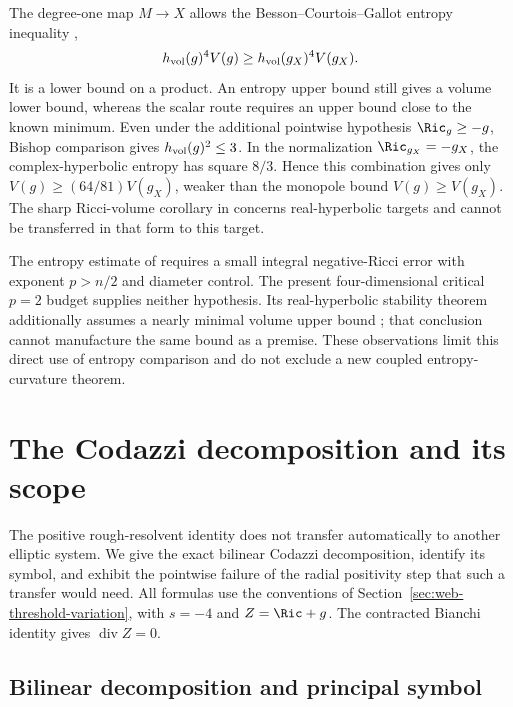 The degree-one map $M\to X$ allows the Besson--Courtois--Gallot
entropy inequality \cite{BessonCourtoisGallot1995},
\begin{equation}\label{webvar:entropy-volume}
 h_{\rm vol}(g)^4V(g)\ge h_{\rm vol}(g_X)^4V(g_X).
\end{equation}
It is a lower bound on a product.  An entropy upper bound still
gives a volume lower bound, whereas the scalar route requires an
upper bound close to the known minimum.  Even under the additional
pointwise hypothesis $\Ric_g\ge-g$, Bishop comparison gives
$h_{\rm vol}(g)^2\le3$.  In the normalization $\Ric_{g_X}=-g_X$,
the complex-hyperbolic entropy has square $8/3$.  Hence this
combination gives only $V(g)\ge(64/81)V(g_X)$, weaker than
the monopole bound $V(g)\ge V(g_X)$.  The sharp Ricci-volume
corollary in \cite{BessonCourtoisGallot1995} concerns real-hyperbolic
targets and cannot be transferred in that form to this target.

The entropy estimate of \cite[Theorem~1.4]{ChenWei} requires a
small integral negative-Ricci error with exponent $p>n/2$ and
diameter control.  The present four-dimensional critical $p=2$
budget supplies neither hypothesis.  Its real-hyperbolic stability
theorem additionally assumes a nearly minimal volume upper bound
\cite[Theorem~1.5]{ChenWei}; that conclusion cannot manufacture
the same bound as a premise.  These observations limit this direct
use of entropy comparison and do not exclude a new coupled
entropy-curvature theorem.

\section{The Codazzi decomposition and its scope}
\label{sec:web-codazzi-scope}

The positive rough-resolvent identity does not transfer automatically
to another elliptic system.  We give the exact bilinear Codazzi
decomposition, identify its symbol, and exhibit the pointwise failure
of the radial positivity step that such a transfer would need.
All formulas use the conventions of
Section~\ref{sec:web-threshold-variation}, with $s=-4$ and $Z=\Ric+g$.
The contracted Bianchi identity gives $\operatorname{div}Z=0$.

\subsection{Bilinear decomposition and principal symbol}

